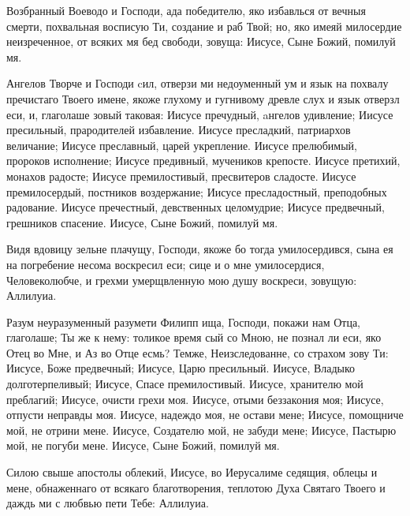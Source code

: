 \begin{mymulticols}



Возбранный  Воеводо и Господи, ада победителю, яко избавлься от вечныя смерти, похвальная восписую Ти, создание и раб Твой; но, яко имеяй милосердие неизреченное, от всяких мя бед свободи, зовуща: Иисусе, Сыне Божий, помилуй мя.



Ангелов
Творче и Господи cил, отверзи ми недоуменный ум и язык на похвалу пречистаго Твоего имене, якоже глухому и гугнивому древле слух и язык отверзл еси, и, глаголаше зовый таковая: Иисусе пречудный, aнгелов удивление; Иисусе пресильный, прародителей избавление. Иисусе пресладкий, патриархов величание; Иисусе преславный, царей укрепление. Иисусе прелюбимый, пророков исполнение; Иисусе предивный, мучеников крепосте. Иисусе претихий, монахов радосте; Иисусе премилостивый,
пресвитеров сладосте. Иисусе премилосердый, постников воздержание; Иисусе пресладостный, преподобных радование. Иисусе пречестный, девственных целомудрие; Иисусе предвечный, грешников спасение. Иисусе, Сыне Божий, помилуй мя.


Видя
вдовицу зельне плачущу, Господи, якоже бо тогда умилосердився, сына ея на погребение несома воскресил еси; сице и о мне умилосердися, Человеколюбче, и грехми умерщвленную мою душу воскреси, зовущую: Аллилуиа.


Разум
неуразуменный разумети Филипп ища, Господи, покажи нам Отца, глаголаше; Ты же к нему: толикое время сый со Мною, не познал ли еси, яко Отец во Мне, и Аз во Отце есмь? Темже, Неизследованне, со страхом зову Ти: Иисусе, Боже предвечный; Иисусе, Царю пресильный. Иисусе, Владыко долготерпеливый; Иисусе, Спасе премилостивый. Иисусе, хранителю мой преблагий; Иисусе, очисти грехи моя. Иисусе, отыми беззакония моя; Иисусе, отпусти неправды моя. Иисусе, надеждо моя, не остави мене; Иисусе, помощниче мой, не отрини мене. Иисусе, Создателю мой, не забуди
мене; Иисусе, Пастырю мой, не погуби мене. Иисусе, Сыне Божий, помилуй мя.


Силою
свыше апостолы облекий, Иисусе, во Иерусалиме седящия, облецы и мене, обнаженнаго от всякаго благотворения, теплотою Духа Святаго Твоего и даждь ми с любвью пети Тебе: Аллилуиа.


\end{mymulticols}
